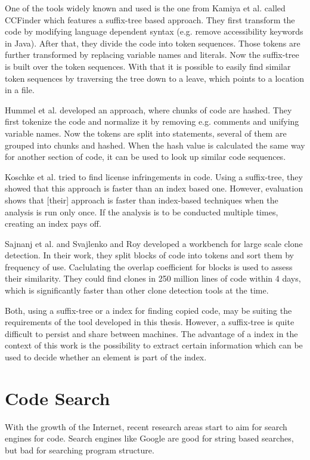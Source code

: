 One of the tools widely known and used is the one from Kamiya et al. called CCFinder\cite{kamiya2002ccfinder} which features a suffix-tree based approach.
They first transform the code by modifying language dependent syntax (e.g. remove accessibility keywords in Java).
After that, they divide the code into token sequences.
Those tokens are further transformed by replacing variable names and literals.
Now the suffix-tree is built over the token sequences. 
With that it is possible to easily find similar token sequences by traversing the tree down to a leave, which points to a location in a file.

Hummel et al.\cite{hummel2010index} developed an approach, where chunks of code are hashed.
They first tokenize the code and normalize it by removing e.g. comments and unifying variable names.
Now the tokens are split into statements, several of them are grouped into chunks and hashed.
When the hash value is calculated the same way for another section of code, it can be used to look up similar code sequences.

Koschke et al. \cite{koschke2014large,koschke2012large} tried to find license infringements in code.
Using a suffix-tree, they showed that this approach is faster than an index based one.
However, \glqq evaluation shows that [their] approach is faster than index-based techniques when the analysis is run only once. If the analysis is to be conducted multiple times, creating an index pays off\grqq \cite{koschke2014large}.

Sajnanj et al. \cite{sajnani2016sourcerercc} and Svajlenko and Roy \cite{svajlenko2017fast} developed a workbench for large scale clone detection.
In their work, they split blocks of code into tokens and sort them by frequency of use.
Caclulating the overlap coefficient for blocks is used to assess their similarity.
They could find clones in 250 million lines of code within 4 days, which is significantly faster than other clone detection tools at the time.

Both, using a suffix-tree or a index for finding copied code, may be suiting the requirements of the tool developed in this thesis.
However, a suffix-tree is quite difficult to persist and share between machines.
The advantage of a index in the context of this work is the possibility to extract certain information which can be used to decide whether an element is part of the index.

\section{Code Search}\label{section:related_work/code_search}
With the growth of the Internet, recent research areas start to aim for search engines for code.
Search engines like Google are good for string based searches, but bad for searching program structure.

